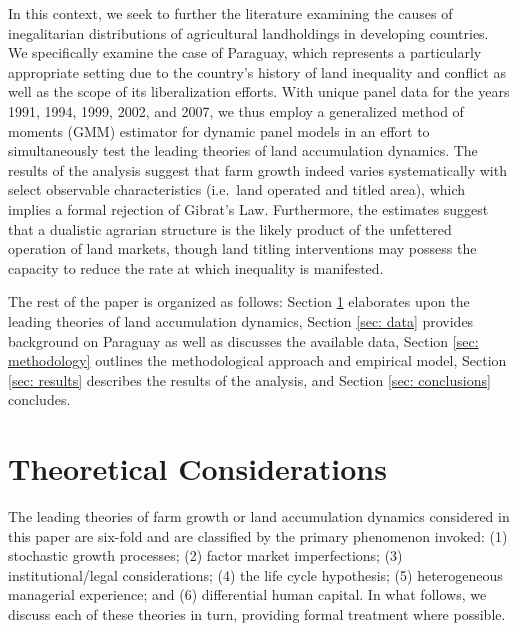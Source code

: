 \documentclass[english]{article}
\begin{document}
In this context, we seek to further the literature examining the causes of 
inegalitarian distributions of agricultural landholdings in developing 
countries.
We specifically examine the case of Paraguay, which represents a particularly 
appropriate setting due to the country's history of land inequality and conflict 
as well as the scope of its liberalization efforts.
With unique panel data for the years 1991, 1994, 1999, 2002, and 2007, we thus 
employ a generalized method of moments (GMM) estimator for dynamic panel 
models in an effort to simultaneously test the leading theories of land 
accumulation dynamics.
The results of the analysis suggest that farm growth indeed varies 
systematically with select observable characteristics 
(i.e.\ land operated and titled area), which implies a formal rejection of 
Gibrat's Law. 
Furthermore, the estimates suggest that a dualistic agrarian structure is the 
likely product of the unfettered operation of land markets, though land titling 
interventions may possess the capacity to reduce the rate at which inequality 
is manifested.

The rest of the paper is organized as follows: Section \ref{sec: theories} 
elaborates upon the leading theories of land accumulation dynamics, 
Section \ref{sec: data} provides background on Paraguay as well as discusses 
the available data, Section \ref{sec: methodology} outlines the methodological 
approach and empirical model, Section \ref{sec: results} describes the results 
of the analysis, and Section \ref{sec: conclusions} concludes.


\section{Theoretical Considerations}
\label{sec: theories}

The leading theories of farm growth or land accumulation dynamics 
considered in this paper are six-fold and are classified by the primary 
phenomenon invoked: (1) stochastic growth processes; (2) factor market 
imperfections; (3) institutional/legal considerations; (4) the life cycle 
hypothesis; (5) heterogeneous managerial experience; and (6) differential 
human capital. In what follows, we discuss each of these theories in turn, 
providing formal treatment where possible.
\end{document}
